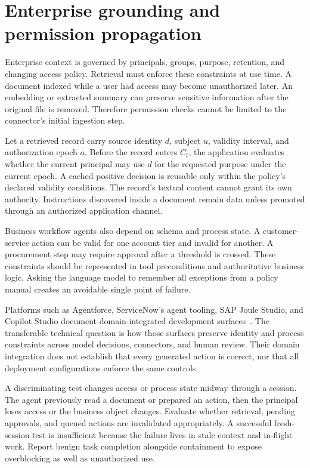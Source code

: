 \section{Enterprise grounding and permission propagation}\label{sec:C24:enterprise}
Enterprise context is governed by principals, groups, purpose, retention, and changing access policy. Retrieval must enforce these constraints at use time. A document indexed while a user had access may become unauthorized later. An embedding or extracted summary can preserve sensitive information after the original file is removed. Therefore permission checks cannot be limited to the connector's initial ingestion step.

Let a retrieved record carry source identity $d$, subject $u$, validity interval, and authorization epoch $a$. Before the record enters $C_t$, the application evaluates whether the current principal may use $d$ for the requested purpose under the current epoch. A cached positive decision is reusable only within the policy's declared validity conditions. The record's textual content cannot grant its own authority. Instructions discovered inside a document remain data unless promoted through an authorized application channel.

Business workflow agents also depend on schema and process state. A customer-service action can be valid for one account tier and invalid for another. A procurement step may require approval after a threshold is crossed. These constraints should be represented in tool preconditions and authoritative business logic. Asking the language model to remember all exceptions from a policy manual creates an avoidable single point of failure.

Platforms such as Agentforce, ServiceNow's agent tooling, SAP Joule Studio, and Copilot Studio document domain-integrated development surfaces~\cite{executionproduct045,executionproduct046,executionproduct081,executionproduct072}. The transferable technical question is how those surfaces preserve identity and process constraints across model decisions, connectors, and human review. Their domain integration does not establish that every generated action is correct, nor that all deployment configurations enforce the same controls.

A discriminating test changes access or process state midway through a session. The agent previously read a document or prepared an action, then the principal loses access or the business object changes. Evaluate whether retrieval, pending approvals, and queued actions are invalidated appropriately. A successful fresh-session test is insufficient because the failure lives in stale context and in-flight work. Report benign task completion alongside containment to expose overblocking as well as unauthorized use.

